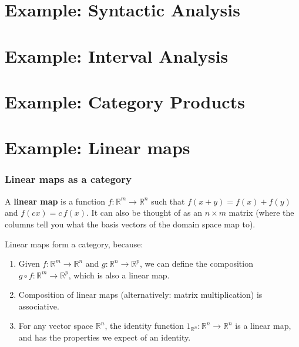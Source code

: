 \documentclass[10pt]{beamer}
\theoremstyle{definition}
\theoremstyle{remark}
\numberwithin{equation}{section}
\begin{document}
\begin{frame}[fragile]{}
\end{frame}

\begin{frame}[fragile]{}
\end{frame}

\begin{frame}[fragile]{}
\end{frame}

\begin{frame}[fragile]{}
\end{frame}

\begin{frame}[fragile]{}
\end{frame}

\begin{frame}[fragile]{}
\end{frame}

\section{Example: Syntactic Analysis} %

\section{Example: Interval Analysis} %

\section{Example: Category Products} %

\section{Example: Linear maps} %

\begin{frame}[fragile]{}
  \frametitle{Linear maps as a category}

  A \textbf{linear map} is a function $f\colon \mathbb{R}^m \rightarrow \mathbb{R}^n$
  such that $f(x + y) = f(x) + f(y)$ and $f(cx) = c\,f(x)$.
  It can also be thought of as an $n \times m$ matrix (where the columns tell you
  what the basis vectors of the domain space map to).

  Linear maps form a category, because:
  \begin{enumerate}
  \item Given $f\colon \mathbb{R}^m \rightarrow \mathbb{R}^n$ and $g\colon \mathbb{R}^n \rightarrow
    \mathbb{R}^p$, we can define the composition $g \circ f \colon \mathbb{R}^m \rightarrow
    \mathbb{R}^p$, which is also a linear map.
  \item Composition of linear maps (alternatively: matrix multiplication) is
    associative.
  \item For any vector space $\mathbb{R}^n$, the identity function
    $1_{\mathbb{R}^n}\colon \mathbb{R}^n \rightarrow \mathbb{R}^n$ is a linear map, and
    has the properties we expect of an identity.
  \end{enumerate}
\end{frame}
\end{document}
